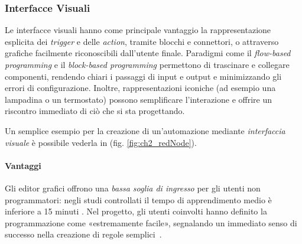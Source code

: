 
\subsubsection{Interfacce Visuali}

Le interfacce visuali hanno come principale vantaggio la rappresentazione esplicita dei \emph{trigger} e delle \emph{action}, tramite blocchi e connettori, o attraverso grafiche facilmente riconoscibili dall’utente finale. Paradigmi come il \emph{flow-based programming} e il \emph{block-based programming} permettono di trascinare e collegare componenti, rendendo chiari i passaggi di input e output e minimizzando gli errori di configurazione. Inoltre, rappresentazioni iconiche (ad esempio una lampadina o un termostato) possono semplificare l’interazione e offrire un riscontro immediato di ciò che si sta progettando.

Un semplice esempio per la creazione di un'automazione mediante \textit{interfaccia visuale} è possibile vederla in (fig. \ref{fig:ch2_redNode}).

\paragraph{Vantaggi}

Gli editor grafici offrono una \emph{bassa soglia di ingresso} per gli utenti non programmatori: negli studi controllati il tempo di apprendimento medio è inferiore a 15 minuti \cite{Desolda2017}. 
Nel progetto, gli utenti coinvolti hanno definito la programmazione come «estremamente facile», segnalando un immediato senso di successo nella creazione di regole semplici~\cite{Coutaz2016}.



